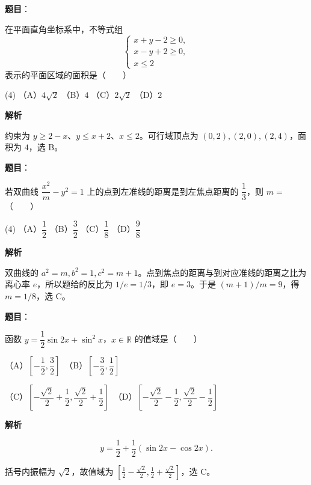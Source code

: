 \begin{answer}

\textbf{题目}：

在平面直角坐标系中，不等式组
\nopagebreak[4]
\[
\begin{cases}
x+y-2\geqslant0,\\
x-y+2\geqslant0,\\
x\leqslant2
\end{cases}
\]
表示的平面区域的面积是\mbox{（　　）}

\begin{gkopts}(4)
\task （A）$4\sqrt2$
\task （B）$4$
\task （C）$2\sqrt2$
\task （D）$2$
\end{gkopts}

\textbf{解析}

约束为 $y\ge2-x$、$y\le x+2$、$x\le2$。可行域顶点为 $(0,2),(2,0),(2,4)$，面积为 $4$，选 B。


\end{answer}
\begin{answer}

\textbf{题目}：

若双曲线 $\dfrac{x^2}{m}-y^2=1$ 上的点到左准线的距离是到左焦点距离的 $\dfrac13$，则 $m=$\mbox{（　　）}

\begin{gkopts}(4)
\task （A）$\dfrac12$
\task （B）$\dfrac32$
\task （C）$\dfrac18$
\task （D）$\dfrac98$
\end{gkopts}

\textbf{解析}

双曲线的 $a^2=m,b^2=1,c^2=m+1$。点到焦点的距离与到对应准线的距离之比为离心率 $e$，所以题给的反比为 $1/e=1/3$，即 $e=3$。于是 $(m+1)/m=9$，得 $m=1/8$，选 C。


\end{answer}
\begin{answer}

\textbf{题目}：

函数 $y=\dfrac12\sin2x+\sin^2x$，$x\in\mathbb R$ 的值域是\mbox{（　　）}

（A）$\left[-\dfrac12,\dfrac32\right]$　（B）$\left[-\dfrac32,\dfrac12\right]$

（C）$\left[-\dfrac{\sqrt2}{2}+\dfrac12,\dfrac{\sqrt2}{2}+\dfrac12\right]$　（D）$\left[-\dfrac{\sqrt2}{2}-\dfrac12,\dfrac{\sqrt2}{2}-\dfrac12\right]$

\textbf{解析}

\nopagebreak[4]
\[
y=\frac12+\frac12(\sin2x-\cos2x).
\]

括号内振幅为 $\sqrt2$，故值域为 $[\frac12-\frac{\sqrt2}{2},\frac12+\frac{\sqrt2}{2}]$，选 C。


\end{answer}
